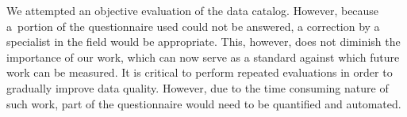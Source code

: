 We attempted an objective evaluation of the data catalog.
However, because a~portion of the questionnaire used could not be answered, a correction by a specialist in the field would be appropriate.
This, however, does not diminish the importance of our work, which can now serve as a standard against which future work can be measured.
It is critical to perform repeated evaluations in order to gradually improve data quality.
However, due to the time consuming nature of such work, part of the questionnaire would need to be quantified and automated.
